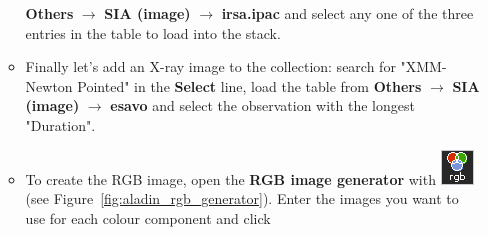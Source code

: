 \documentclass [a4paper, 12pt]{article}
\begin{document}
\begin{itemize}
\begin{itemize}
         \textbf{Others} $\rightarrow$ \textbf{SIA (image)} $\rightarrow$
         \textbf{irsa.ipac} and select any one of the three entries in the
         table to load into the stack.
         \item Finally let's add an X-ray image to the collection: search for
         "XMM-Newton Pointed" in the \textbf{Select} line, load the table from
         \textbf{Others} $\rightarrow$ \textbf{SIA (image)} $\rightarrow$
         \textbf{esavo} and select the observation with the longest "Duration".
         \item To create the RGB image, open the \textbf{RGB image generator}
         with \includegraphics[width=0.04
         \textwidth]{../images/aladin_button_rgb.png} (see
         Figure~\ref{fig:aladin_rgb_generator}). Enter the images you want to
         use for each colour component and click
     \end{itemize}


\end{itemize}
\end{document}
